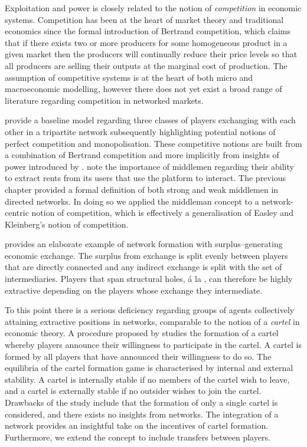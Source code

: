 Exploitation and power is closely related to the notion of \emph{competition} in economic systems. Competition has been at the heart of market theory and traditional economics since the formal introduction of Bertrand competition, which claims that if there exists two or more producers for some homogeneous product in a given market then the producers will continually reduce their price levels so that all producers are selling their outputs at the marginal cost of production. The assumption of competitive systems is at the heart of both micro and macroeconomic modelling, however there does not yet exist a broad range of literature regarding competition in networked markets.

\citet{EasleyKleinberg2010} provide a baseline model regarding three classes of players exchanging with each other in a tripartite network subsequently highlighting potential notions of perfect competition and monopolisation. These competitive notions are built from a combination of Bertrand competition and more implicitly from insights of power introduced by \citet{Emerson1962}. \citet{GillesDiamantaris2013} note the importance of middlemen regarding their ability to extract rents from its users that use the platform to interact. The previous chapter provided a formal definition of both strong and weak middlemen in directed networks. In doing so we applied the middleman concept to a network-centric notion of competition, which is effectively a generalisation of Easley and Kleinberg's notion of competition.

\citet{GoyalVega-holes} provides an elaborate example of network formation with surplus--generating economic exchange. The surplus from exchange is split evenly between players that are directly connected and any indirect exchange is split with the set of intermediaries. Players that span structural holes, \'{a} la \citet{Burt1992}, can therefore be highly extractive depending on the players whose exchange they intermediate.

To this point there is a serious deficiency regarding groups of agents collectively attaining extractive positions in networks, comparable to the notion of a \emph{cartel} in economic theory. A procedure proposed by \citet{Aspremont1983} studies the formation of a cartel whereby players announce their willingness to participate in the cartel. A cartel is formed by all players that have announced their willingness to do so. The equilibria of the cartel formation game is characterised by internal and external stability. A cartel is internally stable if no members of the cartel wish to leave, and a cartel is externally stable if no outsider wishes to join the cartel. Drawbacks of the study include that the formation of only a single cartel is considered, and there exists no insights from networks. The integration of a network provides an insightful take on the incentives of cartel formation. Furthermore, we extend the concept to include transfers between players.

